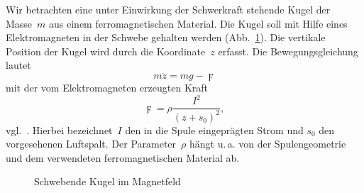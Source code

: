 \begin{example}
\label{exa:Kugel-Magnetfeld}Wir betrachten eine unter Einwirkung
der Schwerkraft stehende Kugel der Masse~$m$ aus einem ferromagnetischen
Material. Die Kugel soll mit Hilfe eines Elektromagneten in der Schwebe
gehalten werden (Abb.~\ref{fig:Kugel-im-Magnetfeld}). Die vertikale
Position der Kugel wird durch die Koordinate~$z$ erfasst. Die Bewegungsgleichung
lautet 
\[
m\ddot{z}=mg-\digamma
\]
mit der vom Elektromagneten erzeugten Kraft 
\[
\digamma=\rho\frac{I^{2}}{(z+s_{0})^{2}},
\]
vgl.~\cite{levine1996,von-loewis2002}. Hierbei bezeichnet~$I$
den in die Spule eingeprägten Strom und $s_{0}$ den vorgesehenen
Luftspalt. Der Parameter~$\rho$ hängt u.\,a. von der Spulengeometrie
und dem verwendeten ferromagnetischen Material ab.

\begin{figure}
\begin{centering}
\resizebox{0.35\textwidth}{!}{}
\par\end{centering}
\caption{Schwebende Kugel im Magnetfeld\label{fig:Kugel-im-Magnetfeld}}

\end{figure}


\end{example}
